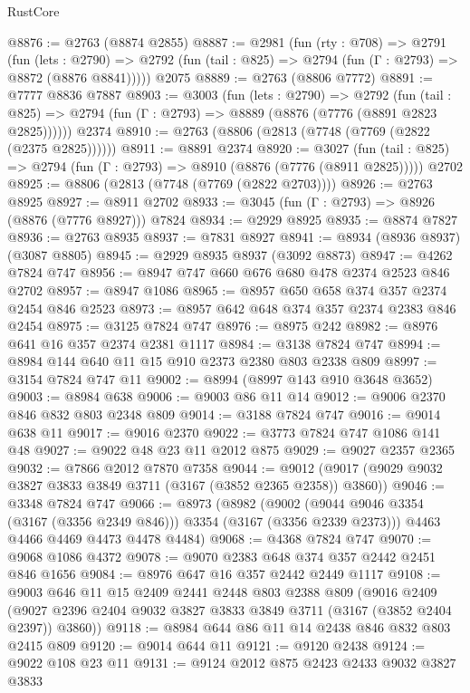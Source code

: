 \begin{lexlean}{RustCore}
\begin{coremodule}
@8876 := @2763 (@8874 @2855)
@8887 := @2981
    (fun (rty : @708) =>
    @2791
      (fun (lets : @2790) =>
      @2792 (fun (tail : @825) => @2794 (fun (Γ : @2793) => @8872 (@8876 @8841)))))
    @2075
@8889 := @2763 (@8806 @7772)
@8891 := @7777 @8836 @7887
@8903 := @3003
    (fun (lets : @2790) =>
    @2792
      (fun (tail : @825) => @2794 (fun (Γ : @2793) => @8889 (@8876 (@7776 (@8891 @2823 @2825))))))
    @2374
@8910 := @2763 (@8806 (@2813 (@7748 (@7769 (@2822 (@2375 @2825))))))
@8911 := @8891 @2374
@8920 := @3027
    (fun (tail : @825) => @2794 (fun (Γ : @2793) => @8910 (@8876 (@7776 (@8911 @2825)))))
    @2702
@8925 := @8806 (@2813 (@7748 (@7769 (@2822 @2703))))
@8926 := @2763 @8925
@8927 := @8911 @2702
@8933 := @3045 (fun (Γ : @2793) => @8926 (@8876 (@7776 @8927))) @7824
@8934 := @2929 @8925
@8935 := @8874 @7827
@8936 := @2763 @8935
@8937 := @7831 @8927
@8941 := @8934 (@8936 @8937) (@3087 @8805)
@8945 := @2929 @8935 @8937 (@3092 @8873)
@8947 := @4262 @7824 @747
@8956 := @8947 @747 @660 @676 @680 @478 @2374 @2523 @846 @2702
@8957 := @8947 @1086
@8965 := @8957 @650 @658 @374 @357 @2374 @2454 @846 @2523
@8973 := @8957 @642 @648 @374 @357 @2374 @2383 @846 @2454
@8975 := @3125 @7824 @747
@8976 := @8975 @242
@8982 := @8976 @641 @16 @357 @2374 @2381 @1117
@8984 := @3138 @7824 @747
@8994 := @8984 @144 @640 @11 @15 @910 @2373 @2380 @803 @2338 @809
@8997 := @3154 @7824 @747 @11
@9002 := @8994 (@8997 @143 @910 @3648 @3652)
@9003 := @8984 @638
@9006 := @9003 @86 @11 @14
@9012 := @9006 @2370 @846 @832 @803 @2348 @809
@9014 := @3188 @7824 @747
@9016 := @9014 @638 @11
@9017 := @9016 @2370
@9022 := @3773 @7824 @747 @1086 @141 @48
@9027 := @9022 @48 @23 @11 @2012 @875
@9029 := @9027 @2357 @2365
@9032 := @7866 @2012 @7870 @7358
@9044 := @9012 (@9017 (@9029 @9032 @3827 @3833 @3849 @3711 (@3167 (@3852 @2365 @2358)) @3860))
@9046 := @3348 @7824 @747
@9066 := @8973
    (@8982
      (@9002 (@9044 @9046 @3354 (@3167 (@3356 @2349 @846))) @3354 (@3167 (@3356 @2339 @2373)))
      @4463
      @4466
      @4469
      @4473
      @4478
      @4484)
@9068 := @4368 @7824 @747
@9070 := @9068 @1086 @4372
@9078 := @9070 @2383 @648 @374 @357 @2442 @2451 @846 @1656
@9084 := @8976 @647 @16 @357 @2442 @2449 @1117
@9108 := @9003
    @646
    @11
    @15
    @2409
    @2441
    @2448
    @803
    @2388
    @809
    (@9016
      @2409
      (@9027 @2396 @2404 @9032 @3827 @3833 @3849 @3711 (@3167 (@3852 @2404 @2397)) @3860))
@9118 := @8984 @644 @86 @11 @14 @2438 @846 @832 @803 @2415 @809
@9120 := @9014 @644 @11
@9121 := @9120 @2438
@9124 := @9022 @108 @23 @11
@9131 := @9124 @2012 @875 @2423 @2433 @9032 @3827 @3833

\end{coremodule}
\end{lexlean}
